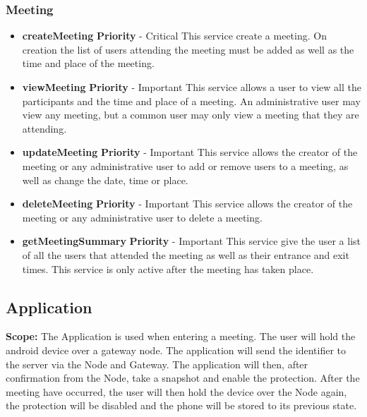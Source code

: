 \documentclass{article}
\begin{document}
		\subsubsection{Meeting}
		\begin{itemize}
			\item \textbf{createMeeting}
				\newline\textbf{ Priority } - Critical
				\newline This service create a meeting. On creation the list of users attending the meeting must be added as well as the time and place of the meeting.
			\item \textbf{viewMeeting}
				\newline\textbf{ Priority } - Important
				\newline This service allows a user to view all the participants and the time and place of a meeting. An administrative user may view any meeting, but a common user may only view a meeting that they are attending.
			\item \textbf{updateMeeting}
				\newline\textbf{ Priority } - Important
				\newline This service allows the creator of the meeting or any administrative user to add or remove users to a meeting, as well as change the date, time or place.
			\item \textbf{deleteMeeting}
				\newline\textbf{ Priority } - Important
				\newline This service allows the creator of the meeting or any administrative user to delete a meeting.
			\item \textbf{getMeetingSummary}
				\newline\textbf{ Priority } - Important
				\newline This service give the user a list of all the users that attended the meeting as well as their entrance and exit times. This service is only active after the meeting has taken place.

		\end{itemize}

\newpage
		\subsection{Application}
			\textbf{Scope: }The Application is used when entering a meeting. The user will hold the android device over a gateway node. The application will send the identifier to the server via the Node and Gateway. The application will then, after confirmation from the Node, take a snapshot and enable the protection. After the meeting have occurred, the user will then hold the device over the Node again, the protection will be disabled and the phone will be stored to its previous state. 
		
\end{document}
